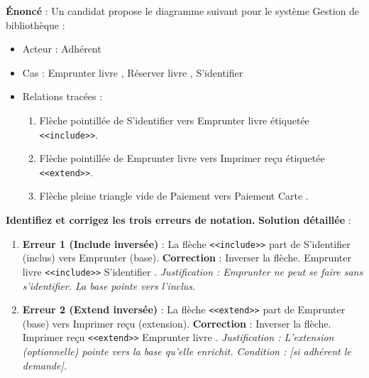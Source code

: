 \documentclass[11pt]{article}
\begin{document}
\begin{exoresolu}
\textbf{Énoncé} : Un candidat propose le diagramme suivant pour le système \guillemotleft Gestion de bibliothèque \guillemotright :
\begin{itemize}
    \item Acteur : \guillemotleft Adhérent \guillemotright
    \item Cas : \guillemotleft Emprunter livre \guillemotright, \guillemotleft Réserver livre \guillemotright, \guillemotleft S'identifier \guillemotright
    \item Relations tracées :
    \begin{enumerate}
        \item Flèche pointillée de \guillemotleft S'identifier \guillemotright vers \guillemotleft Emprunter livre \guillemotright étiquetée \texttt{<<include>>}.
        \item Flèche pointillée de \guillemotleft Emprunter livre \guillemotright vers \guillemotleft Imprimer reçu \guillemotright étiquetée \texttt{<<extend>>}.
        \item Flèche pleine triangle vide de \guillemotleft Paiement \guillemotright vers \guillemotleft Paiement Carte \guillemotright.
    \end{enumerate}
\end{itemize}
\textbf{Identifiez et corrigez les trois erreurs de notation.}
\tcblower
\textbf{Solution détaillée} :

\begin{enumerate}
    \item \textbf{Erreur 1 (Include inversée)} : La flèche \texttt{<<include>>} part de \guillemotleft S'identifier \guillemotright (inclus) vers \guillemotleft Emprunter \guillemotright (base).
    \textbf{Correction} : Inverser la flèche. \guillemotleft Emprunter livre \guillemotright \texttt{<<include>>} \guillemotleft S'identifier \guillemotright. \textit{Justification : Emprunter ne peut se faire sans s'identifier. La base pointe vers l'inclus.}
    
    \item \textbf{Erreur 2 (Extend inversée)} : La flèche \texttt{<<extend>>} part de \guillemotleft Emprunter \guillemotright (base) vers \guillemotleft Imprimer reçu \guillemotright (extension).
    \textbf{Correction} : Inverser la flèche. \guillemotleft Imprimer reçu \guillemotright \texttt{<<extend>>} \guillemotleft Emprunter livre \guillemotright. \textit{Justification : L'extension (optionnelle) pointe vers la base qu'elle enrichit. Condition : [si adhérent le demande].}
    

\end{enumerate}
\end{exoresolu}
\end{document}
